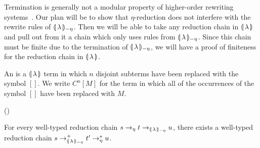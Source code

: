 Termination is generally not a modular property of higher-order rewriting
systems~\cite{appel2010higher}. Our plan will be to show that
$\eta$-reduction does not interfere with the rewrite rules of
${\llparenthesis \, \lambda \, \rrparenthesis_{-\eta}}$. Then we will be able to take any reduction chain in ${\llparenthesis \, \lambda \, \rrparenthesis}$ and
pull out from it a chain which only uses rules from ${\llparenthesis \, \lambda \, \rrparenthesis_{-\eta}}$. Since this
chain must be finite due to the termination of ${\llparenthesis \, \lambda \, \rrparenthesis_{-\eta}}$, we will have a
proof of finiteness for the reduction chain in ${\llparenthesis \, \lambda \, \rrparenthesis}$.

\begin{definition}
  An  is a $\llparenthesis \, \lambda \, \rrparenthesis$ term
  in which $n$ disjoint subterms have been replaced with the symbol
  $[]$. We write $C^n[M]$ for the term in which all of the occurrences of
  the symbol $[]$ have been replaced with $M$.
\end{definition}

\begin{lemma}\label{lem:eta-exchange}
  ()

  For every well-typed reduction chain $s \to_\eta t \to_{\llparenthesis \, \lambda \, \rrparenthesis_{-\eta}} u$, there
  exists a well-typed reduction chain $s \to^+_{\llparenthesis \, \lambda \, \rrparenthesis_{-\eta}} t' \to^*_\eta u$.
\end{lemma}

